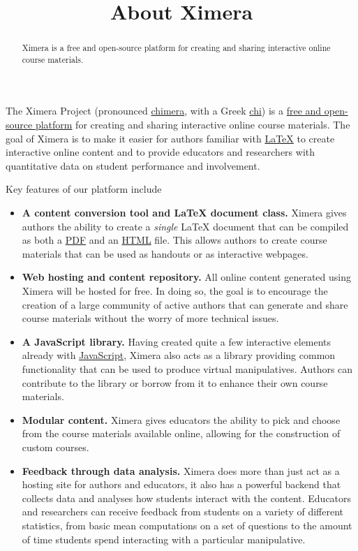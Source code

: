 \documentclass{ximera}
\title{About Ximera}
\begin{document}
\begin{abstract}
  Ximera is a free and open-source platform for creating and sharing
  interactive online course materials.
\end{abstract}
\maketitle


The Ximera Project (pronounced
\href{http://en.wikipedia.org/wiki/Chimera_(mythology)}{chimera}, with a
Greek \href{http://en.wikipedia.org/wiki/Chi_(letter)}{chi}) is a
\href{https://github.com/kisonecat/ximera}{free and open-source
platform} for creating and sharing interactive online course materials.
The goal of Ximera is to make it easier for authors familiar with
\href{http://en.wikipedia.org/wiki/LaTeX}{LaTeX} to create interactive
online content and to provide educators and researchers with
quantitative data on student performance and involvement.

Key features of our platform include

\begin{itemize}
\item
  \textbf{A content conversion tool and LaTeX document class.} Ximera
  gives authors the ability to create a \emph{single} LaTeX document
  that can be compiled as both a
  \href{http://en.wikipedia.org/wiki/Portable_Document_Format}{PDF} and
  an \href{http://en.wikipedia.org/wiki/HTML_file}{HTML} file. This
  allows authors to create course materials that can be used as handouts
  or as interactive webpages.
\item
  \textbf{Web hosting and content repository.} All online content
  generated using Ximera will be hosted for free. In doing so, the goal
  is to encourage the creation of a large community of active authors
  that can generate and share course materials without the worry of more
  technical issues.
\item
  \textbf{A JavaScript library.} Having created quite a few interactive
  elements already with
  \href{http://en.wikipedia.org/wiki/JavaScript}{JavaScript}, Ximera
  also acts as a library providing common functionality that can be used
  to produce virtual manipulatives. Authors can contribute to the
  library or borrow from it to enhance their own course materials.
\item
  \textbf{Modular content.} Ximera gives educators the ability to pick
  and choose from the course materials available online, allowing for
  the construction of custom courses.
\item
  \textbf{Feedback through data analysis.} Ximera does more than just
  act as a hosting site for authors and educators, it also has a
  powerful backend that collects data and analyses how students interact
  with the content. Educators and researchers can receive feedback from
  students on a variety of different statistics, from basic mean
  computations on a set of questions to the amount of time students
  spend interacting with a particular manipulative.
\end{itemize}
\end{document}
